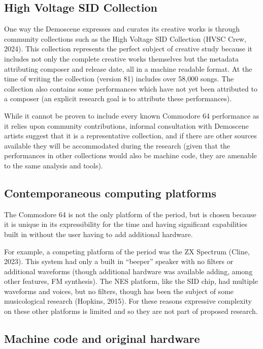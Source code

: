 \documentclass[10pt]{article}
\begin{document}
\begin{multicols*}{2}
\subsection{High Voltage SID Collection}

One way the Demoscene expresses and curates its creative works is through community collections such as the High Voltage SID Collection (HVSC Crew, 2024). This collection represents the perfect subject of creative study because it includes not only the complete creative works themselves but the metadata attributing composer and release date, all in a machine readable format. At the time of writing the collection (version 81) includes over 58,000 songs. The collection also contains some performances which have not yet been attributed to a composer (an explicit research goal is to attribute these performances).

While it cannot be proven to include every known Commodore 64 performance as it relies upon community contributions, informal consultation with Demoscene artists suggest that it is a representative collection, and if there are other sources available they will be accommodated during the research (given that the performances in other collections would also be machine code, they are amenable to the same analysis and tools).

\subsection{Contemporaneous computing platforms}

The Commodore 64 is not the only platform of the period, but is chosen because it is unique in its expressibility for the time and having significant capabilities built in without the user having to add additional hardware.

For example, a competing platform of the period was the ZX Spectrum (Cline, 2023). This system had only a built in “beeper” speaker with no filters or additional waveforms (though additional hardware was available adding, among other features, FM synthesis). The NES platform, like the SID chip, had multiple waveforms and voices, but no filters, though has been the subject of some musicological research (Hopkins, 2015). For these reasons expressive complexity on these other platforms is limited and so they are not part of proposed research.

\subsection{Machine code and original hardware}


\end{multicols*}
\end{document}
